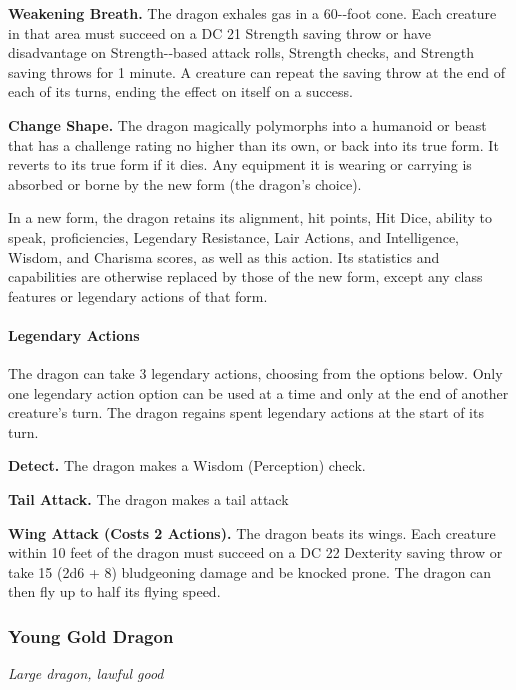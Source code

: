 \documentclass[
]{article}
\begin{document}
\textbf{Weakening Breath.} The dragon exhales gas in a 60-­‐foot cone.
Each creature in that area must succeed on a DC 21 Strength saving throw
or have disadvantage on Strength-­‐based attack rolls, Strength checks,
and Strength saving throws for 1 minute. A creature can repeat the
saving throw at the end of each of its turns, ending the effect on
itself on a success.

\textbf{Change Shape.} The dragon magically polymorphs into a humanoid
or beast that has a challenge rating no higher than its own, or back
into its true form. It reverts to its true form if it dies. Any
equipment it is wearing or carrying is absorbed or borne by the new form
(the dragon's choice).

In a new form, the dragon retains its alignment, hit points, Hit Dice,
ability to speak, proficiencies, Legendary Resistance, Lair Actions, and
Intelligence, Wisdom, and Charisma scores, as well as this action. Its
statistics and capabilities are otherwise replaced by those of the new
form, except any class features or legendary actions of that form.

\hypertarget{legendary-actions-17}{%
\paragraph{Legendary Actions}\label{legendary-actions-17}}

The dragon can take 3 legendary actions, choosing from the options
below. Only one legendary action option can be used at a time and only
at the end of another creature's turn. The dragon regains spent
legendary actions at the start of its turn.

\textbf{Detect.} The dragon makes a Wisdom (Perception) check.

\textbf{Tail Attack.} The dragon makes a tail attack

\textbf{Wing Attack (Costs 2 Actions).} The dragon beats its wings. Each
creature within 10 feet of the dragon must succeed on a DC 22 Dexterity
saving throw or take 15 (2d6 + 8) bludgeoning damage and be knocked
prone. The dragon can then fly up to half its flying speed.

\hypertarget{young-gold-dragon}{%
\subsubsection{Young Gold Dragon}\label{young-gold-dragon}}

\emph{Large dragon, lawful good}
\end{document}
